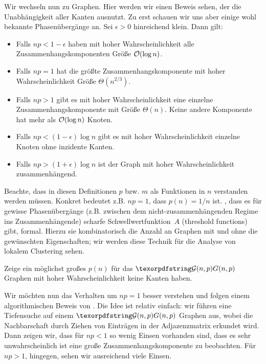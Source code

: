 Wir wechseln nun zu \Gnp Graphen.
Hier werden wir einen Beweis sehen, der die Unabhängigkeit aller Kanten ausnutzt.
Zu erst schauen wir uns aber einige wohl bekannte Phasenübergänge an.
Sei $\epsilon >0$ hinreichend klein.
Dann gilt:
\begin{itemize}
    \item Falls $np < 1 - \epsilon$ haben mit hoher Wahrscheinlichkeit alle Zusammenhangskomponenten Größe $\mathcal{O}\!\left(\log n\right)$.
    \item Falls $np = 1$ hat die größte Zusammenhangskomponente mit hoher Wahrscheinlichkeit Größe $\Theta(n^{2/3})$.
    \item Falls $np > 1$ gibt es mit hoher Wahrscheinlichkeit eine einzelne Zusammenhangskomponente mit Größe $\Theta(n)$.
          Keine andere Komponente hat mehr als $\mathcal{O}\!\left(\log n\right)$ Knoten.

    \item Falls $np < (1-\epsilon)\log n$ gibt es mit hoher Wahrscheinlichkeit einzelne Knoten ohne inzidente Kanten.
    \item Falls $np > (1+\epsilon)\log n$ ist der Graph mit hoher Wahrscheinlichkeit zusammenhängend.
\end{itemize}

Beachte, dass in diesen Definitionen $p$ bzw. $m$ als Funktionen in $n$ verstanden werden müssen.
Konkret bedeutet z.B. $np = 1$, dass $p(n) = 1 /n$ ist.
, dass es für gewisse Phasenübergänge (z.B. zwischen dem nicht-zusammenhängenden Regime ins Zusammenhängende) scharfe Schwellwertfunktion~$A$ (threshold functions) gibt, formal.
Hierzu  sie kombinatorisch die Anzahl an Graphen mit und ohne die gewünschten Eigenschaften; wir werden diese Technik für die Analyse von lokalem Clustering sehen.

\begin{exercise}
    Zeige ein möglichst großes $p(n)$ für das $\Gnp$ Graphen mit hoher Wahrscheinlichkeit keine Kanten haben.
\end{exercise}

Wir möchten nun das Verhalten um $np = 1$ besser verstehen und folgen einem algorithmischen Beweis von \cite{DBLP:journals/rsa/KrivelevichS13}.
Die Idee ist relativ einfach:
wir führen eine Tiefensuche auf einem $\Gnp$ Graphen aus, wobei die Nachbarschaft durch Ziehen von Einträgen in der Adjazenzmatrix erkundet wird.
Dann zeigen wir, dass für $np < 1$ so wenig Einsen vorhanden sind, dass es sehr unwahrscheinlich ist eine große Zusammenhangskomponente zu beobachten.
Für $np > 1$, hingegen, sehen wir ausreichend viele Einsen.

